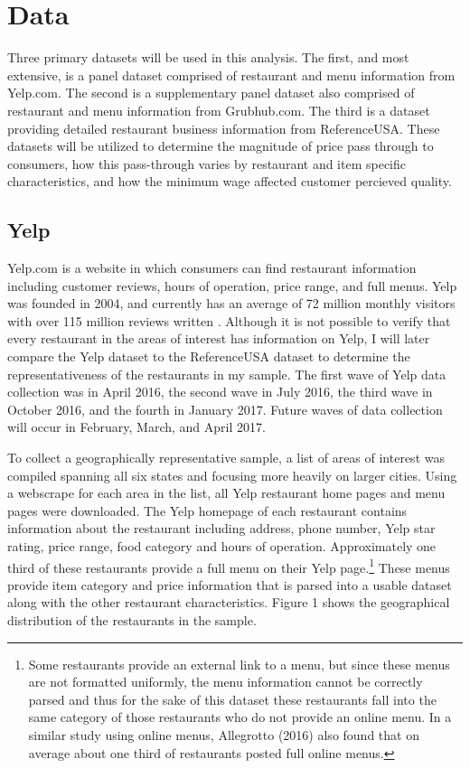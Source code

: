 \documentclass[11pt]{article}
\begin{document}
\section{Data}

Three primary datasets will be used in this analysis. The first, and most extensive,  is a panel dataset comprised of restaurant and menu information from Yelp.com. The second is a supplementary panel dataset also comprised of restaurant and menu information from Grubhub.com.  The third is a dataset providing detailed restaurant business information from ReferenceUSA. These datasets will be utilized to determine the magnitude of price pass through to consumers, how this pass-through varies by restaurant and item specific characteristics, and how the minimum wage affected customer percieved quality.

\subsection{Yelp}

Yelp.com is a website in which consumers can find restaurant information including customer reviews, hours of operation, price range, and full menus. Yelp was founded in 2004, and currently has an average of 72 million monthly visitors with over 115 million reviews written \cite{yelpstat}. Although it is not possible to verify that every restaurant in the areas of interest has information on Yelp, I will later compare the Yelp dataset to the ReferenceUSA dataset to determine the representativeness of the restaurants in my sample. The first wave of Yelp data collection was in April 2016, the second wave in July 2016, the third wave in October 2016, and the fourth in January 2017. Future waves of data collection will occur in February, March, and April 2017.

To collect a geographically representative sample, a list of areas of interest was compiled spanning all six states and focusing more heavily on larger cities. Using a webscrape for each area in the list, all Yelp restaurant home pages and menu pages were downloaded. The Yelp homepage of each restaurant contains information about the restaurant including address, phone number, Yelp star rating, price range, food category and hours of operation. Approximately one third of these restaurants provide a full menu on their Yelp page.\footnote{Some restaurants provide an external link to a menu, but since these menus are not formatted uniformly, the menu information cannot be correctly parsed and thus for the sake of this dataset these restaurants fall into the same category of those restaurants who do not provide an online menu. In a similar study using online menus, Allegrotto (2016) also found that on average about one third of restaurants posted full online menus\nocite{allegretto2016local}.} These menus provide item category and price information that is parsed into a usable dataset along with the other restaurant characteristics. Figure 1 shows the geographical distribution of the restaurants in the sample.
\end{document}
